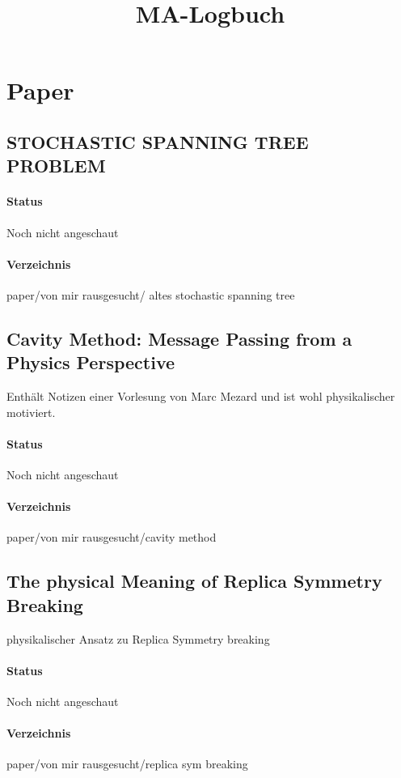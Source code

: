 \documentclass[paper=a4,10pt]{scrartcl}
\begin{document}
\title{MA-Logbuch}

\section{Paper}
\subsection{STOCHASTIC SPANNING TREE PROBLEM}
\paragraph{Status} Noch nicht angeschaut
\paragraph{Verzeichnis} paper/von mir rausgesucht/ altes stochastic spanning tree

\subsection{Cavity Method:  Message Passing from a Physics Perspective}

Enthält Notizen einer Vorlesung von Marc Mezard und ist wohl physikalischer motiviert.

\paragraph{Status} Noch nicht angeschaut
\paragraph{Verzeichnis} paper/von mir rausgesucht/cavity method

\subsection{The physical Meaning of Replica Symmetry Breaking}

physikalischer Ansatz zu Replica Symmetry breaking

\paragraph{Status} Noch nicht angeschaut
\paragraph{Verzeichnis} paper/von mir rausgesucht/replica sym breaking
\end{document}
